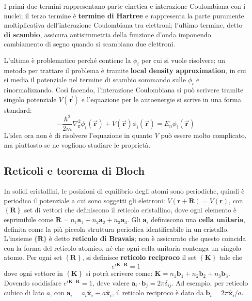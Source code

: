 \documentclass[10pt, a4paper]{scrartcl}
\numberwithin{equation}{subsection}
\theoremstyle{style1}
\theoremstyle{style2}
\begin{document}
I primi due termini rappresentano parte cinetica e interazione Coulombiana con i nuclei; il terzo termine \`e \textbf{termine di Hartree} e rappresenta la parte puramente moltiplicativa dell'interazione Coulombiana tra elettroni; l'ultimo termine, detto \textbf{di scambio}, assicura antisimmetria della funzione d'onda imponendo cambiamento di segno quando si scambiano due elettroni.

L'ultimo \`e problematico perch\'e contiene la $\phi _i$ per cui si vuole risolvere;
un metodo per trattare il problema \`e tramite \textbf{local density approximation}, in cui si media il potenziale nel termine di scambio sommando sulle $\phi _i$ e rinormalizzando. 
Cos\`i facendo, l'interazione Coulombiana si pu\`o scrivere tramite singolo potenziale $V(\vec{\mathbf{r} })$ e l'equazione per le autoenergie si scrive in una forma standard:
\begin{equation}\label{eser}
	-\frac{\hbar ^2}{2m} \nabla ^2_\mathbf{r} \phi _i(\vec{\mathbf{r} }) + V(\vec{\mathbf{r} }) \phi _i (\vec{\mathbf{r} }) = E_n \phi _i (\vec{\mathbf{r} })
\end{equation}
L'idea ora non \`e di risolvere l'equazione in quanto $V$ pu\`o essere molto complicato, ma piuttosto se ne vogliono studiare le propriet\`a.
\subsection{Reticoli e teorema di Bloch}
In solidi cristallini, le posizioni di equilibrio degli atomi sono periodiche, quindi \`e periodico il potenziale a cui sono soggetti gli elettroni: $V(\mathbf{r} +\mathbf{R} ) = V(\mathbf{r} )$, con $\left\{ \mathbf{R}  \right\} $ set di vettori che definiscono il reticolo cristallino, dove ogni elemento \`e esprimibile come $\mathbf{R} = n_1\mathbf{a} _1 + n_2 \mathbf{a} _2 + n_3 \mathbf{a} _3$. 
Gli $\mathbf{a} _i$ definiscono una \textbf{cella unitaria}, definita come la pi\`u piccola struttura periodica identificabile in un cristallo. 
L'insieme $\{\mathbf{R} \}$ \`e detto \textbf{reticolo di Bravais}; non \`e assicurato che questo coincida con la forma del reticolo atomico, n\'e che ogni cella unitaria contenga un singolo atomo.
Per ogni set $\left\{ \mathbf{R}  \right\} $, si definisce \textbf{reticolo reciproco} il set $\left\{ \mathbf{K}  \right\} $ tale che
\[
e^{i \mathbf{K} \cdot \mathbf{R} }  =1 
\] 
dove ogni vettore in $\left\{ \mathbf{K}  \right\} $ si potr\`a scrivere come: $\mathbf{K}  = n_1 \mathbf{b} _1 + n_2 \mathbf{b} _2 + n_3 \mathbf{b} _3$.
Dovendo soddisfare $e^{i \mathbf{K} \cdot \mathbf{R} } = 1$, deve valere $\mathbf{a} _i \cdot \mathbf{b} _j = 2\pi \delta _{ij} $.
Ad esempio, per reticolo cubico di lato $a$, con $\mathbf{a} _i = a_i \hat{\mathbf{x} }_i\equiv a \hat{\mathbf{x} }_i$, il reticolo reciproco \`e dato da $\mathbf{b} _i = 2\pi \hat{\mathbf{x} }_i / a$.
\end{document}
